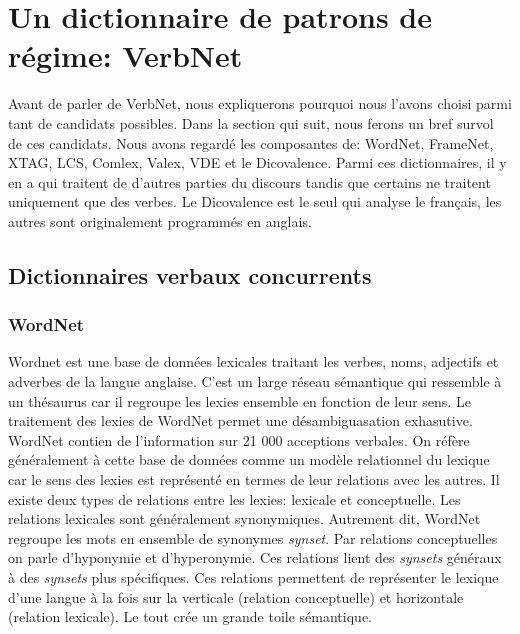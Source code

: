 
\chapter{Un dictionnaire de patrons de régime: VerbNet}

Avant de parler de VerbNet, nous expliquerons pourquoi nous l'avons choisi parmi tant de candidats possibles. Dans la section qui suit, nous ferons un bref survol de ces candidats. Nous avons regardé les composantes de: WordNet, FrameNet, XTAG, LCS, Comlex, Valex, VDE et le Dicovalence. Parmi ces dictionnaires, il y en a qui traitent de d'autres parties du discours tandis que certains ne traitent uniquement que des verbes. Le Dicovalence est le seul qui analyse le français, les autres sont originalement programmés en anglais.


\section{Dictionnaires verbaux concurrents}\label{dictionconcu}

\subsection{WordNet}
Wordnet \citep{Fellbaum1998} est une base de données lexicales traitant les verbes, noms, adjectifs et adverbes de la langue anglaise. C'est un large réseau sémantique qui ressemble à un thésaurus car il regroupe les lexies ensemble en fonction de leur sens. Le traitement des lexies de WordNet permet une désambiguasation exhasutive. WordNet contien de l'information sur 21 000 acceptions verbales\citep{MillerWordNetonlinelexical1990}. On réfère généralement à cette base de données comme  un modèle relationnel du lexique car le sens des lexies est représenté en termes de leur relations avec les autres. Il existe deux types de relations entre les lexies: lexicale et conceptuelle. Les relations lexicales sont généralement synonymiques. Autrement dit, WordNet regroupe les mots en ensemble de synonymes \emph{synset}. Par relations conceptuelles on parle d'hyponymie et d'hyperonymie. Ces relations lient des \emph{synsets} généraux à des \emph{synsets} plus spécifiques. Ces relations permettent de représenter le lexique d'une langue à la fois sur la verticale (relation conceptuelle) et horizontale (relation lexicale). Le tout crée un grande toile sémantique. 

